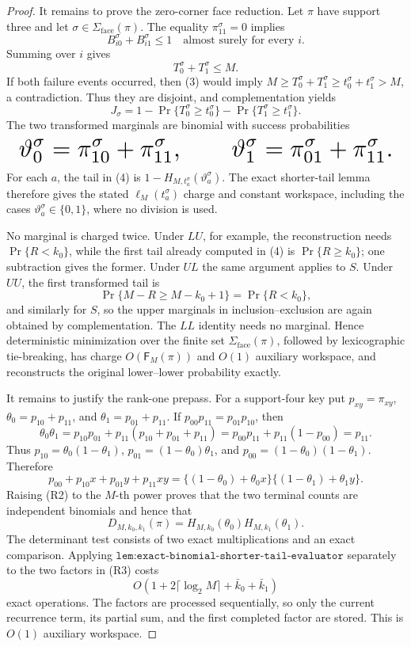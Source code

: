 \documentclass{article}
\begin{document}
\begin{proof}
It remains to prove the zero-corner face reduction. Let \(\pi\) have support three and let \(\sigma\in\Sigma_{\mathrm{face}}(\pi)\). The equality \(\pi^\sigma_{11}=0\) implies
\[
B_{i0}^{\sigma}+B_{i1}^{\sigma}\le1
\quad\text{almost surely for every }i.
\]
Summing over \(i\) gives
\[
T_0^\sigma+T_1^\sigma\le M.
\tag{3}
\]
If both failure events occurred, then (3) would imply
\(M\ge T_0^\sigma+T_1^\sigma\ge t_0^\sigma+t_1^\sigma>M\), a contradiction. Thus they are disjoint, and complementation yields
\[
J_\sigma
=1-\Pr\{T_0^\sigma\ge t_0^\sigma\}
 -\Pr\{T_1^\sigma\ge t_1^\sigma\}.
\tag{4}
\]
The two transformed marginals are binomial with success probabilities
\[
\makebox[\linewidth][c]{\resizebox{0.98\linewidth}{!}{\(\displaystyle \vartheta_0^\sigma=\pi^\sigma_{10}+\pi^\sigma_{11},
\qquad
\vartheta_1^\sigma=\pi^\sigma_{01}+\pi^\sigma_{11}.\)}}
\]
For each \(a\), the tail in (4) is
\(1-H_{M,t_a^\sigma}(\vartheta_a^\sigma)\).
The exact shorter-tail lemma therefore gives the stated \(\ell_M(t_a^\sigma)\) charge and constant workspace, including the cases \(\vartheta_a^\sigma\in\{0,1\}\), where no division is used.

No marginal is charged twice. Under \(LU\), for example, the reconstruction needs \(\Pr\{R<k_0\}\), while the first tail already computed in (4) is \(\Pr\{R\ge k_0\}\); one subtraction gives the former. Under \(UL\) the same argument applies to \(S\). Under \(UU\), the first transformed tail is
\[
\Pr\{M-R\ge M-k_0+1\}=\Pr\{R<k_0\},
\]
and similarly for \(S\), so the upper marginals in inclusion--exclusion are again obtained by complementation. The \(LL\) identity needs no marginal. Hence deterministic minimization over the finite set \(\Sigma_{\mathrm{face}}(\pi)\), followed by lexicographic tie-breaking, has charge \(O(\mathsf F_M(\pi))\) and \(O(1)\) auxiliary workspace, and reconstructs the original lower--lower probability exactly.

It remains to justify the rank-one prepass. For a support-four key put \(p_{xy}=\pi_{xy}\), \(\theta_0=p_{10}+p_{11}\), and \(\theta_1=p_{01}+p_{11}\). If \(p_{00}p_{11}=p_{01}p_{10}\), then
\[
\theta_0\theta_1
=p_{10}p_{01}+p_{11}(p_{10}+p_{01}+p_{11})
=p_{00}p_{11}+p_{11}(1-p_{00})=p_{11}.
\tag{R1}
\]
Thus \(p_{10}=\theta_0(1-\theta_1)\), \(p_{01}=(1-\theta_0)\theta_1\), and \(p_{00}=(1-\theta_0)(1-\theta_1)\). Therefore
\[
p_{00}+p_{10}x+p_{01}y+p_{11}xy
=\{(1-\theta_0)+\theta_0x\}\{(1-\theta_1)+\theta_1y\}.
\tag{R2}
\]
Raising (R2) to the \(M\)-th power proves that the two terminal counts are independent binomials and hence that
\[
D_{M,k_0,k_1}(\pi)=H_{M,k_0}(\theta_0)H_{M,k_1}(\theta_1).
\tag{R3}
\]
The determinant test consists of two exact multiplications and an exact comparison. Applying \(\texttt{lem:exact-binomial-shorter-tail-evaluator}\) separately to the two factors in (R3) costs
\[
O\!\left(1+2\lceil\log_2M\rceil+\bar k_0+\bar k_1\right)
\]
exact operations. The factors are processed sequentially, so only the current recurrence term, its partial sum, and the first completed factor are stored. This is \(O(1)\) auxiliary workspace.
\end{proof}
\end{document}
